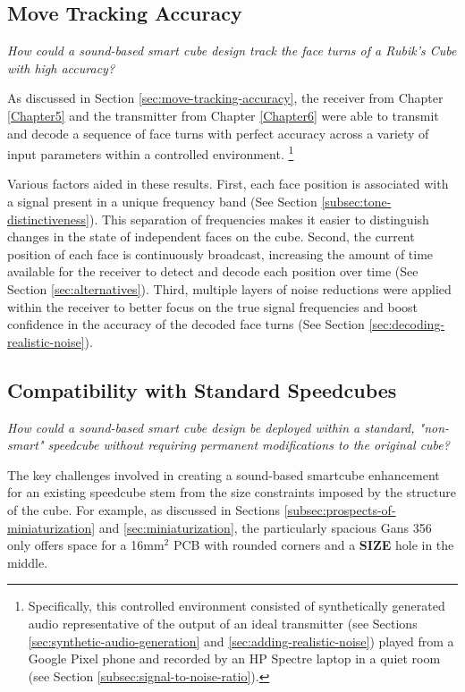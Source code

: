 \subsection{Move Tracking Accuracy}
\label{subsec:answer-accuracy}

\emph{How could a sound-based smart cube design track the face turns of
a Rubik's Cube with high accuracy?}

As discussed in Section \ref{sec:move-tracking-accuracy}, the receiver
from Chapter \ref{Chapter5} and the transmitter from Chapter
\ref{Chapter6} were able to transmit and decode a sequence of face
turns with perfect accuracy across a variety of input parameters within
a controlled environment. \footnote{Specifically, this controlled
environment consisted of synthetically generated audio representative
of the output of an ideal transmitter (see Sections
\ref{sec:synthetic-audio-generation} and
\ref{sec:adding-realistic-noise}) played from a Google Pixel phone and
recorded by an HP Spectre laptop in a quiet room (see Section
\ref{subsec:signal-to-noise-ratio}).}

Various factors aided in these results. First, each face position is
associated with a signal present in a unique frequency band (See
Section \ref{subsec:tone-distinctiveness}). This separation of
frequencies makes it easier to distinguish changes in the state of
independent faces on the cube. Second, the current position of each
face is continuously broadcast, increasing the amount of time available
for the receiver to detect and decode each position over time (See
Section \ref{sec:alternatives}). Third, multiple layers of noise
reductions were applied within the receiver to better focus on the true
signal frequencies and boost confidence in the accuracy of the decoded
face turns (See Section \ref{sec:decoding-realistic-noise}).


\subsection{Compatibility with Standard Speedcubes}
\label{subsec:answer-compatibility}

\emph{How could a sound-based smart cube design be deployed within a
standard, "non-smart" speedcube without requiring permanent
modifications to the original cube?}

The key challenges involved in creating a sound-based smartcube
enhancement for an existing speedcube stem from the size constraints
imposed by the structure of the cube. For example, as discussed in
Sections \ref{subsec:prospects-of-miniaturization} and
\ref{sec:miniaturization}, the particularly spacious Gans 356 only
offers space for a 16mm$^2$ PCB with rounded corners and a
\textbf{SIZE} hole in the middle.


